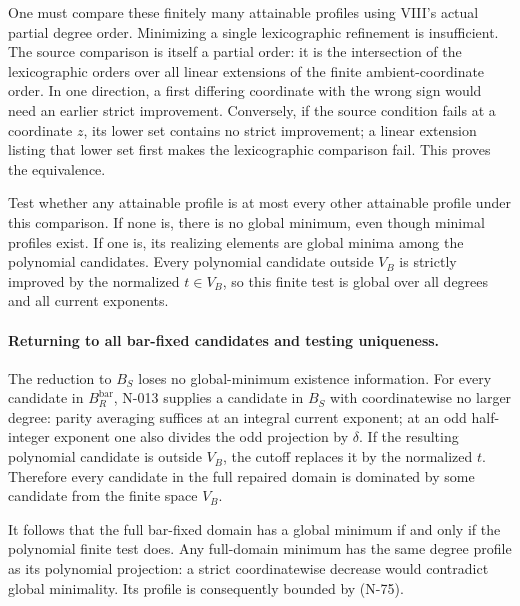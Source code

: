 One must compare these finitely many attainable profiles
using VIII's actual partial degree order.  Minimizing a
single lexicographic refinement is insufficient.  The
source comparison is itself a partial order: it is the
intersection of the lexicographic orders over all linear
extensions of the finite ambient-coordinate order.  In
one direction, a first differing coordinate with the wrong
sign would need an earlier strict improvement.  Conversely,
if the source condition fails at a coordinate $z$, its lower
set contains no strict improvement; a linear extension
listing that lower set first makes the lexicographic
comparison fail.  This proves the equivalence.

Test whether any attainable profile is at most every other
attainable profile under this comparison.  If none is,
there is no global minimum, even though minimal profiles
exist.  If one is, its realizing elements are global
minima among the polynomial candidates.  Every polynomial
candidate outside $V_B$ is strictly improved by the
normalized $t\in V_B$, so this finite test is global over
all degrees and all current exponents.

\paragraph{Returning to all bar-fixed candidates and testing uniqueness.}
The reduction to $B_S$ loses no global-minimum existence
information.  For every candidate in $B_R^{\mathrm{bar}}$,
N-013 supplies a candidate in $B_S$ with coordinatewise
no larger degree: parity averaging suffices at an integral
current exponent; at an odd half-integer exponent one also
divides the odd projection by $\delta$.  If the resulting
polynomial candidate is outside $V_B$, the cutoff replaces
it by the normalized $t$.  Therefore every candidate in
the full repaired domain is dominated by some candidate
from the finite space $V_B$.

It follows that the full bar-fixed domain has a global
minimum if and only if the polynomial finite test does.
Any full-domain minimum has the same degree profile as
its polynomial projection: a strict coordinatewise
decrease would contradict global minimality.  Its profile
is consequently bounded by (N-75).

